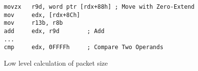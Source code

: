 \documentclass{report}
\begin{document}
\begin{listing}[H]
    \begin{verbatim}
movzx   r9d, word ptr [rdx+88h] ; Move with Zero-Extend
mov     edx, [rdx+8Ch]
mov     r13b, r8b
add     edx, r9d        ; Add
...
cmp     edx, 0FFFFh     ; Compare Two Operands
\end{verbatim}
\caption{Low level calculation of packet size}
\label{listing:detection:hooking:packet-size-asm}
\end{listing}
\end{document}
